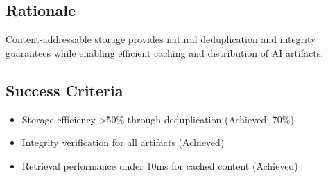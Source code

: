 \subsection*{Rationale}

Content-addressable storage provides natural deduplication and integrity guarantees while enabling efficient caching and distribution of AI artifacts.

\subsection*{Success Criteria}

\begin{itemize}
\item Storage efficiency >50\% through deduplication (Achieved: 70\%)
\item Integrity verification for all artifacts (Achieved)
\item Retrieval performance under 10ms for cached content (Achieved)
\end{itemize}
